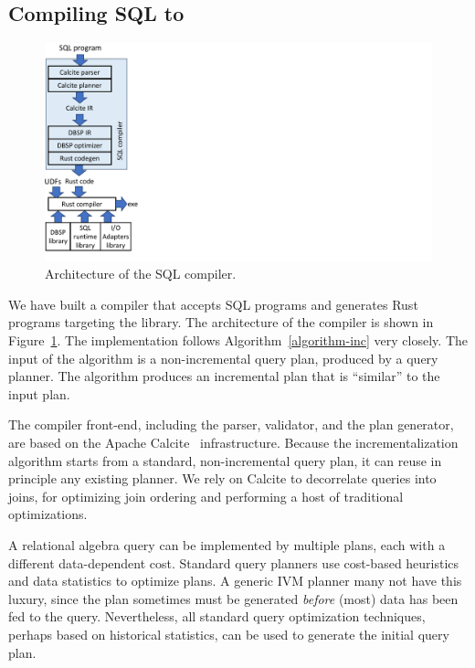 \subsection{Compiling SQL to \dbsp}

\begin{figure}[t]
  \begin{center}
    \includegraphics[trim={0 0in 10in 0},clip,scale=.45]{tools.pdf}
    \caption{\label{fig:tools}Architecture of the SQL compiler.}
  \end{center}
\end{figure}

We have built a compiler that accepts SQL programs and generates Rust
programs targeting the \dbsp library.  The architecture of the
compiler is shown in Figure~\ref{fig:tools}.  The implementation
follows Algorithm~\ref{algorithm-inc} very closely.  The input of the
algorithm is a non-incremental query plan, produced by a query
planner.  The algorithm produces an incremental plan that is
``similar'' to the input plan.

The compiler front-end, including the parser, validator, and the plan
generator, are based on the Apache Calcite~\cite{begoli-icmd18}
infrastructure.  Because the incrementalization algorithm starts from
a standard, non-incremental query plan, it can reuse in principle any
existing planner.  We rely on Calcite to decorrelate queries into
joins, for optimizing join ordering and performing a host of
traditional optimizations.

A relational algebra query can be implemented by multiple plans, each
with a different data-dependent cost.  Standard query planners use
cost-based heuristics and data statistics to optimize plans.  A
generic IVM planner many not have this luxury, since the plan
sometimes must be generated \emph{before} (most) data has been fed
to the query.  Nevertheless, all standard query optimization
techniques, perhaps based on historical statistics, can be used to
generate the initial query plan.

